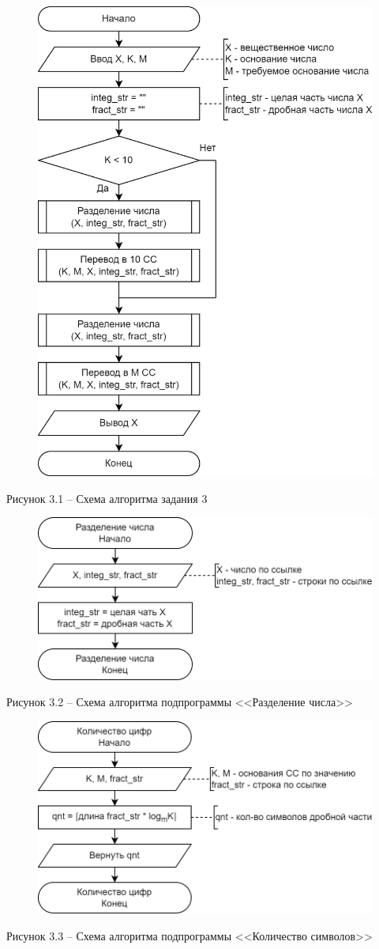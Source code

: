 \documentclass[a4paper,14pt]{extarticle}
\begin{document}
  \begin{figure}[h]
    \centering
    \includegraphics[width=0.6\linewidth]{schemes/s-3-1}
  \end{figure}
  \begin{center}
    Рисунок 3.1 – Схема алгоритма задания 3
  \end{center}
  \pagebreak

  \begin{figure}[h]
    \centering
    \includegraphics[width=0.6\linewidth]{schemes/s-3-2}
  \end{figure}
  \begin{center}
    Рисунок 3.2 – Схема алгоритма подпрограммы <<Разделение числа>>
  \end{center}

  \begin{figure}[h]
    \centering
    \includegraphics[width=0.6\linewidth]{schemes/s-3-3}
  \end{figure}
  \begin{center}
    Рисунок 3.3 – Схема алгоритма подпрограммы <<Количество символов>>
  \end{center}
  \pagebreak
\end{document}
